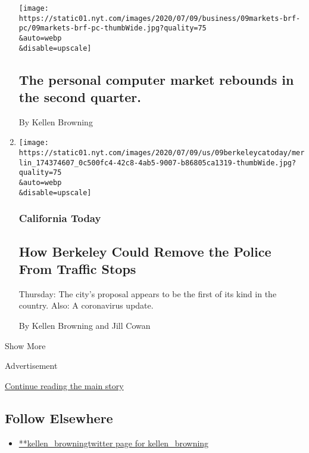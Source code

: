 \begin{enumerate}
  \texttt{[image: https://static01.nyt.com/images/2020/07/09/business/09markets-brf-pc/09markets-brf-pc-thumbWide.jpg?quality=75\\\&auto=webp\\\&disable=upscale]}

  \hypertarget{the-personal-computer-market-rebounds-in-the-second-quarter}{%
  \subsection{The personal computer market rebounds in the second
  quarter.}\label{the-personal-computer-market-rebounds-in-the-second-quarter}}

  By Kellen Browning
\item
  \href{/2020/07/09/us/berkeley-ca-police-department-reform.html}{}

  \texttt{[image: https://static01.nyt.com/images/2020/07/09/us/09berkeleycatoday/merlin\_174374607\_0c500fc4-42c8-4ab5-9007-b86805ca1319-thumbWide.jpg?quality=75\\\&auto=webp\\\&disable=upscale]}

  \hypertarget{california-today-1}{%
  \subsubsection{California Today}\label{california-today-1}}

  \hypertarget{how-berkeley-could-remove-the-police-from-traffic-stops}{%
  \subsection{How Berkeley Could Remove the Police From Traffic
  Stops}\label{how-berkeley-could-remove-the-police-from-traffic-stops}}

  Thursday: The city's proposal appears to be the first of its kind in
  the country. Also: A coronavirus update.

  By Kellen Browning and Jill Cowan
\end{enumerate}

Show More

Advertisement

\protect\hyperlink{after-mid2}{Continue reading the main story}

\hypertarget{follow-elsewhere}{%
\subsection{Follow Elsewhere}\label{follow-elsewhere}}

\begin{itemize}
\tightlist
\item
  \href{https://twitter.com/kellen_browning}{**kellen\_browningtwitter
  page for kellen\_browning}
\end{itemize}

